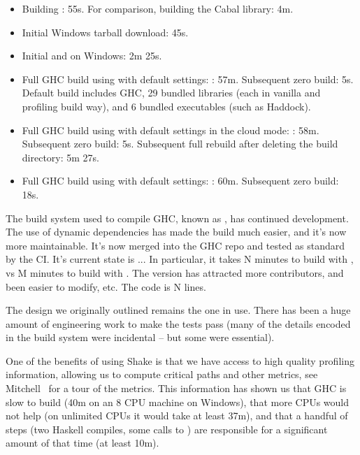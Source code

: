 \begin{itemize}
  \item Building \Hadrian: 55s. For comparison, building the Cabal library: 4m.

  \item Initial Windows tarball download: 45s.

  \item Initial  and  on Windows: 2m 25s.

  \item Full GHC build using \Hadrian with default settings:
        : 57m. Subsequent zero build: 5s.
        Default build includes GHC, 29 bundled libraries (each in vanilla and
        profiling build way), and 6 bundled executables (such as Haddock).

  \item Full GHC build using \Hadrian with default settings in the cloud mode:
        : 58m.
        Subsequent zero build: 5s.
        Subsequent full rebuild after deleting the build directory: 5m 27s.

  \item Full GHC build using \Make with default settings: : 60m.
        Subsequent zero build: 18s.
\end{itemize}


The build system used to compile GHC, known as \Hadrian, has continued
development. The use of dynamic dependencies has made the build much easier, and
it's now more maintainable. It's now merged into the GHC repo and tested as
standard by the CI. It's current state is ... In particular, it takes N minutes
to build with \Shake, vs M minutes to build with \Make. The \Shake version has
attracted more contributors, and been easier to modify, etc. The code is N
lines.

The design we originally outlined remains the one in use. There has been a huge
amount of engineering work to make the tests pass (many of the details encoded
in the \Make build system were incidental -- but some were essential).

One of the benefits of using Shake is that we have access to high quality
profiling information, allowing us to compute critical paths and other metrics,
see Mitchell~ for a tour of the metrics.
This information has shown us that GHC is slow to build (40m on an 8 CPU machine
on Windows), that more CPUs would not help (on unlimited CPUs it would take at
least 37m), and that a handful of steps (two Haskell compiles, some calls to
) are responsible for a significant amount of that time (at least
10m).

